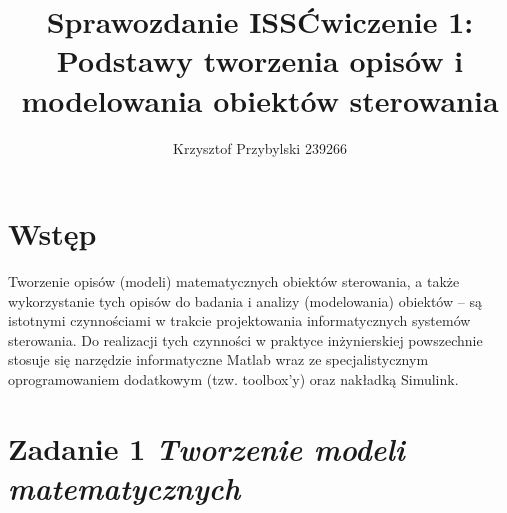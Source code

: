 \documentclass[a4paper,10pt]{article}
\title{Sprawozdanie ISS\newline\small Ćwiczenie 1: Podstawy tworzenia opisów i modelowania obiektów sterowania}
\author{Krzysztof Przybylski 239266}
\begin{document}
\maketitle

\section{Wstęp}\label{sec:wstęp}
Tworzenie opisów (modeli) matematycznych obiektów sterowania, a także wykorzystanie tych opisów do badania i analizy (modelowania) obiektów – są istotnymi czynnościami w trakcie projektowania informatycznych systemów sterowania. Do realizacji tych czynności w praktyce inżynierskiej powszechnie stosuje się narzędzie informatyczne Matlab wraz ze specjalistycznym oprogramowaniem dodatkowym (tzw. toolbox’y) oraz nakładką Simulink.

\section{Zadanie 1 \textit{\small Tworzenie modeli matematycznych}}\label{sec:zad1}
\end{document}
